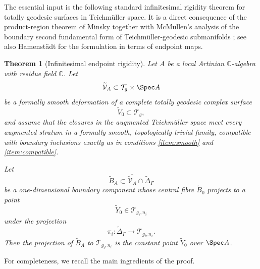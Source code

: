 \documentclass[11pt]{article}
\theoremstyle{plain}
\newtheorem{theorem}{Theorem}[section]
\theoremstyle{definition}
\newcommand{\T}{\mathcal T}
\newcommand{\C}{\mathbb C}
\newcommand{\cV}{\mathcal V}
\begin{document}
The essential input is the following standard infinitesimal rigidity theorem for totally geodesic surfaces in Teichm\"uller space.  It is a direct consequence of the product-region theorem of Minsky \cite{Minsky} together with McMullen's analysis of the boundary second fundamental form of Teichm\"uller-geodesic submanifolds \cite{McMullen}; see also Hamenst\"adt \cite{Hamenstadt} for the formulation in terms of endpoint maps.

\begin{theorem}[Infinitesimal endpoint rigidity]\label{thm:infinitesimal-rigidity}
Let \(A\) be a local Artinian \(\C\)-algebra with residue field \(\C\).  Let
\[
\widetilde{\cV}_{A}\subset \T_{g}\times \Spec A
\]
be a formally smooth deformation of a complete totally geodesic complex surface
\[
\widetilde V_{0}\subset \T_{g},
\]
and assume that the closures in the augmented Teichm\"uller space meet every augmented stratum in a formally smooth, topologically trivial family, compatible with boundary inclusions exactly as in conditions \eqref{item:smooth} and \eqref{item:compatible}.

Let
\[
\widetilde B_{A}\subset \overline{\widetilde{\cV}_{A}}\cap \widetilde\Delta_{\Gamma}
\]
be a one-dimensional boundary component whose central fibre \(\widetilde B_{0}\) projects to a point
\[
\widetilde Y_{0}\in \T_{g_{i},n_{i}}
\]
under the projection
\[
\pi_{i}:\widetilde\Delta_{\Gamma}\to \T_{g_{i},n_{i}}.
\]
Then the projection of \(\widetilde B_{A}\) to \(\T_{g_{i},n_{i}}\) is the constant point \(\widetilde Y_{0}\) over \(\Spec A\).
\end{theorem}

For completeness, we recall the main ingredients of the proof.
\end{document}
